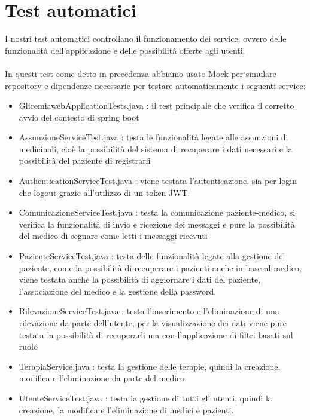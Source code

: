 \documentclass{report}
\begin{document}
\section{Test automatici}
I nostri test automatici controllano il funzionamento dei service, ovvero
delle funzionalità dell'applicazione e delle possibilità offerte agli utenti.
\\ \\
In questi test come detto in precedenza abbiamo usato Mock per simulare repository
e dipendenze necessarie per testare automaticamente i seguenti service:
\begin{itemize}
    \item GlicemiawebApplicationTests.java : il test principale che verifica
    il corretto avvio del contesto di spring boot
    \item AssunzioneServiceTest.java : testa le funzionalità legate alle assunzioni
    di medicinali, cioè la possibilità del sistema di recuperare i dati necessari
    e la possibilità del paziente di registrarli
    \item AuthenticationServiceTest.java : viene testata l'autenticazione, sia
    per login che logout grazie all'utilizzo di un token JWT.
    \item ComunicazioneServiceTest.java : testa la comunicazione paziente-medico,
    si verifica la funzionalità di invio e ricezione dei messaggi e pure la possibilità
    del medico di segnare come letti i messaggi ricevuti
    \item PazienteServiceTest.java : testa delle funzionalità legate alla gestione
    del paziente, come la possibilità di recuperare i pazienti anche in base al medico,
    viene testata anche la possibilità di aggiornare i dati del paziente, l'associazione
    del medico e la gestione della password.
    \item RilevazioneServiceTest.java : testa l'inserimento e l'eliminazione di 
    una rilevazione da parte dell'utente, per la visualizzazione dei dati viene
    pure testata la possibilità di recuperarli ma con l'applicazione di filtri basati
    sul ruolo
    \item TerapiaService.java : testa la gestione delle terapie, quindi la creazione, modifica
    e l'eliminazione da parte del medico.
    \item UtenteServiceTest.java : testa la gestione di tutti gli utenti, quindi la creazione,
    la modifica e l'eliminazione di medici e pazienti.
\end{itemize}
\end{document}
